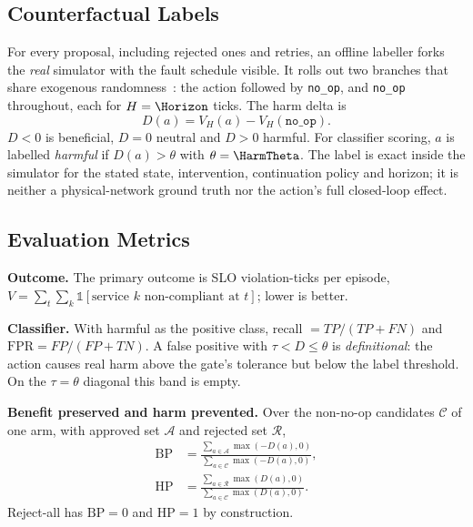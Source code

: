 \documentclass[conference]{IEEEtran}
\begin{document}

\subsection{Counterfactual Labels}

For every proposal, including rejected ones and retries, an offline labeller forks the \emph{real} simulator with the fault schedule visible. It rolls out two branches that share exogenous randomness~\cite{crn}: the action followed by \texttt{no\_op}, and \texttt{no\_op} throughout, each for $H=\Horizon$ ticks. The harm delta is
\begin{equation}
D(a) = V_H(a) - V_H(\texttt{no\_op}).
\label{eq:delta}
\end{equation}
$D<0$ is beneficial, $D=0$ neutral and $D>0$ harmful. For classifier scoring, $a$ is labelled \emph{harmful} if $D(a)>\theta$ with $\theta=\HarmTheta$. The label is exact inside the simulator for the stated state, intervention, continuation policy and horizon; it is neither a physical-network ground truth nor the action's full closed-loop effect.

\subsection{Evaluation Metrics}

\textbf{Outcome.} The primary outcome is SLO violation-ticks per episode, $V=\sum_t\sum_k \mathbb{1}[\text{service } k \text{ non-compliant at } t]$; lower is better.

\textbf{Classifier.} With harmful as the positive class, recall $=TP/(TP+FN)$ and $\mathrm{FPR}=FP/(FP+TN)$. A false positive with $\tau<D\le\theta$ is \emph{definitional}: the action causes real harm above the gate's tolerance but below the label threshold. On the $\tau=\theta$ diagonal this band is empty.

\textbf{Benefit preserved and harm prevented.} Over the non-no-op candidates $\mathcal{C}$ of one arm, with approved set $\mathcal{A}$ and rejected set $\mathcal{R}$,
\begin{equation}
\begin{aligned}
\mathrm{BP}&=\frac{\sum_{a\in\mathcal{A}}\max(-D(a),0)}{\sum_{a\in\mathcal{C}}\max(-D(a),0)},\\
\mathrm{HP}&=\frac{\sum_{a\in\mathcal{R}}\max(D(a),0)}{\sum_{a\in\mathcal{C}}\max(D(a),0)}.
\end{aligned}
\label{eq:bphp}
\end{equation}
Reject-all has $\mathrm{BP}=0$ and $\mathrm{HP}=1$ by construction.
\end{document}
